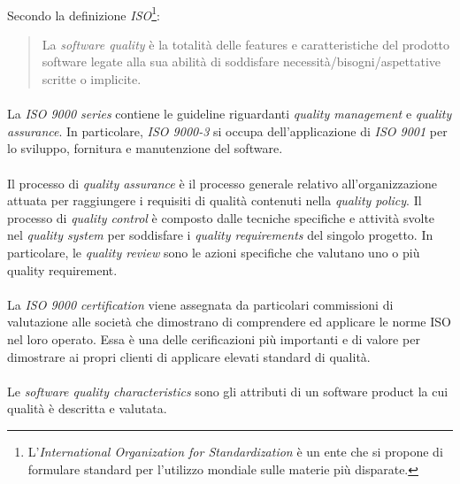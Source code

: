 \documentclass[12pt,a4paper,twoside,english,italian]{book}
\begin{document}
\paragraph{} Secondo la definizione \emph{ISO}\footnote{L'\emph{International Organization for Standardization} è un ente che si propone di formulare standard per l'utilizzo mondiale sulle materie più disparate.}:
\begin{quote}
    La \emph{software quality} è la totalità delle features e caratteristiche del prodotto software legate alla sua abilità di soddisfare necessità/bisogni/aspettative scritte o implicite.
\end{quote}

\paragraph{} La \emph{ISO 9000 series} contiene le guideline riguardanti \emph{quality management} e \emph{quality assurance}. In particolare, \emph{ISO 9000-3} si occupa dell'applicazione di \emph{ISO 9001} per lo sviluppo, fornitura e manutenzione del software. 


\newpage

\paragraph{} Il processo di \emph{quality assurance} è il processo generale relativo all'organizzazione attuata per raggiungere i requisiti di qualità contenuti nella \emph{quality policy}. Il processo di \emph{quality control} è composto dalle tecniche specifiche e attività svolte nel \emph{quality system} per soddisfare i \emph{quality requirements} del singolo progetto. In particolare, le \emph{quality review} sono le azioni specifiche che valutano uno o più quality requirement. 

\paragraph{} La \emph{ISO 9000 certification} viene assegnata da particolari commissioni di valutazione alle società che dimostrano di comprendere ed applicare le norme ISO nel loro operato. Essa è una delle cerificazioni più importanti e di valore per dimostrare ai propri clienti di applicare elevati standard di qualità.

\paragraph{} Le \emph{software quality characteristics} sono gli attributi di un software product la cui qualità è descritta e valutata. 
\end{document}
